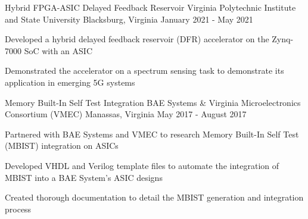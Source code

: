 \begin{cventries}

\cventry
{Hybrid FPGA-ASIC Delayed Feedback Reservoir} %
{Virginia Polytechnic Institute and State University} %
{Blacksburg, Virginia} %
{January 2021 - May 2021} %
{
\begin{cvitems}
\item {Developed a hybrid delayed feedback reservoir (DFR) accelerator on the Zynq-7000 SoC with an ASIC}
\item {Demonstrated the accelerator on a spectrum sensing task to demonstrate its application in emerging 5G systems}
\end{cvitems}
}


\cventry
{Memory Built-In Self Test Integration} %
{BAE Systems \& Virginia Microelectronics Consortium (VMEC)} %
{Manassas, Virginia} %
{May 2017 - August 2017} %
{ %
\begin{cvitems}
\item {Partnered with BAE Systems and VMEC to research Memory Built-In Self Test (MBIST) integration on ASICs}
\item {Developed VHDL and Verilog template files to automate the integration of MBIST into a BAE System's ASIC designs}
\item {Created thorough documentation to detail the MBIST generation and integration process}
\end{cvitems}
}




\end{cventries}